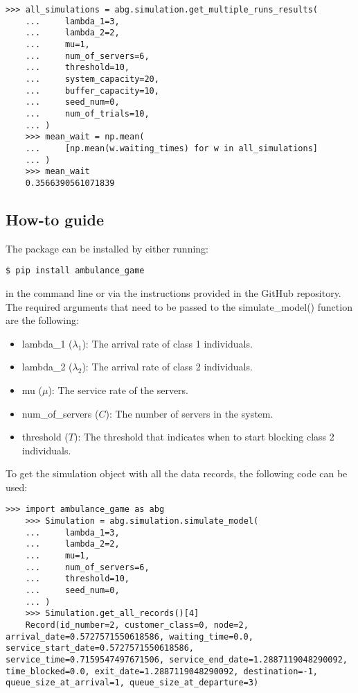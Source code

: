 \begin{lstlisting}[style=pystyle]
    >>> all_simulations = abg.simulation.get_multiple_runs_results(
    ...     lambda_1=3,
    ...     lambda_2=2,
    ...     mu=1,
    ...     num_of_servers=6,
    ...     threshold=10,
    ...     system_capacity=20,
    ...     buffer_capacity=10,
    ...     seed_num=0,
    ...     num_of_trials=10,
    ... )
    >>> mean_wait = np.mean(
    ...     [np.mean(w.waiting_times) for w in all_simulations]
    ... )
    >>> mean_wait
    0.3566390561071839

\end{lstlisting}


\subsection{How-to guide}

The package can be installed by either running:

\begin{lstlisting}[style=terminalstyle]
    $ pip install ambulance_game
\end{lstlisting}

in the command line or via the instructions provided in the GitHub repository.
The required arguments that need to be passed to the simulate\_model() function
are the following:
\begin{itemize}
    \item lambda\_1 (\(\lambda_1\)): The arrival rate of class 1 individuals.
    \item lambda\_2 (\(\lambda_2\)): The arrival rate of class 2 individuals.
    \item mu (\(\mu\)): The service rate of the servers.
    \item num\_of\_servers (\(C\)): The number of servers in the system.
    \item threshold (\(T\)): The threshold that indicates when to start blocking 
    class 2 individuals.
\end{itemize}

To get the simulation object with all the data records, the following code can be
used:
\begin{lstlisting}[style=pystyle]
    >>> import ambulance_game as abg
    >>> Simulation = abg.simulation.simulate_model(
    ...     lambda_1=3,
    ...     lambda_2=2,
    ...     mu=1,
    ...     num_of_servers=6,
    ...     threshold=10,
    ...     seed_num=0,
    ... )
    >>> Simulation.get_all_records()[4]
    Record(id_number=2, customer_class=0, node=2, arrival_date=0.5727571550618586, waiting_time=0.0, service_start_date=0.5727571550618586, service_time=0.7159547497671506, service_end_date=1.2887119048290092, time_blocked=0.0, exit_date=1.2887119048290092, destination=-1, queue_size_at_arrival=1, queue_size_at_departure=3)

\end{lstlisting}

